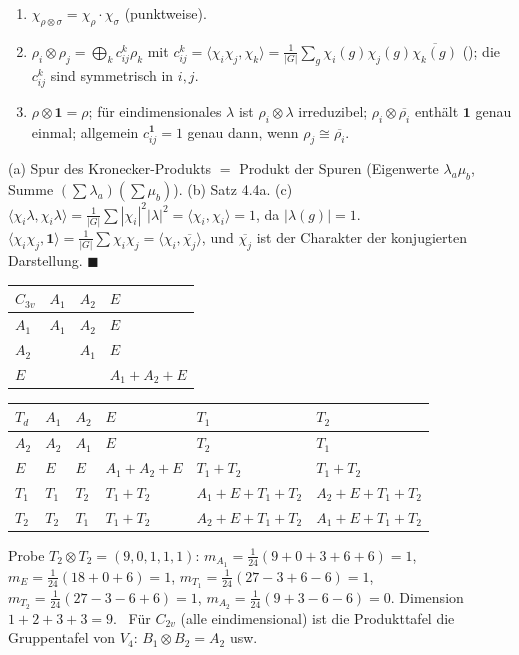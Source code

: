 \begin{merksatz}
\begin{enumerate}[label=(\alph*), leftmargin=1.6em]
\item $\chi_{\rho\otimes\sigma} = \chi_\rho\cdot\chi_\sigma$ (punktweise).
\item $\rho_i\otimes\rho_j = \bigoplus_kc_{ij}^{k}\rho_k$ mit $c_{ij}^{k} = \langle\chi_i\chi_j, \chi_k\rangle = \frac1{|G|}\sum_g\chi_i(g)\chi_j(g)\overline{\chi_k(g)}$ (); die $c_{ij}^{k}$ sind symmetrisch in $i, j$.
\item $\rho\otimes\mathbf 1 = \rho$; für eindimensionales $\lambda$ ist $\rho_i\otimes\lambda$ irreduzibel; $\rho_i\otimes\overline{\rho_i}$ enthält $\mathbf 1$ genau einmal; allgemein $c_{ij}^{\mathbf 1} = 1$ genau dann, wenn $\rho_j\cong\overline{\rho_i}$.
\end{enumerate}

(a) Spur des Kronecker-Produkts $= $ Produkt der Spuren (Eigenwerte $\lambda_a\mu_b$, Summe $(\sum\lambda_a)(\sum\mu_b)$). (b) Satz 4.4a. (c) $\langle\chi_i\lambda, \chi_i\lambda\rangle = \frac1{|G|}\sum|\chi_i|^{2}|\lambda|^{2} = \langle\chi_i, \chi_i\rangle = 1$, da $|\lambda(g)| = 1$. $\langle\chi_i\chi_j, \mathbf 1\rangle = \frac1{|G|}\sum\chi_i\chi_j = \langle\chi_i, \overline{\chi_j}\rangle$, und $\overline{\chi_j}$ ist der Charakter der konjugierten Darstellung. $\blacksquare$

\begin{center}
{\small
\renewcommand{\arraystretch}{1.46}
\begin{tabular}{@{}P{1.0cm}P{0.9cm}P{0.9cm}P{2.6cm}@{}}
\toprule
$C_{3v}$ & $A_1$ & $A_2$ & $E$\\
\midrule
$A_1$ & $A_1$ & $A_2$ & $E$\\
$A_2$ & & $A_1$ & $E$\\
$E$ & & & $A_1 + A_2 + E$\\
\bottomrule
\end{tabular}
\qquad
\begin{tabular}{@{}P{0.8cm}P{0.8cm}P{0.8cm}P{1.8cm}P{2.6cm}P{2.6cm}@{}}
\toprule
$T_d$ & $A_1$ & $A_2$ & $E$ & $T_1$ & $T_2$\\
\midrule
$A_2$ & $A_2$ & $A_1$ & $E$ & $T_2$ & $T_1$\\
$E$ & $E$ & $E$ & $A_1 + A_2 + E$ & $T_1 + T_2$ & $T_1 + T_2$\\
$T_1$ & $T_1$ & $T_2$ & $T_1 + T_2$ & $A_1 + E + T_1 + T_2$ & $A_2 + E + T_1 + T_2$\\
$T_2$ & $T_2$ & $T_1$ & $T_1 + T_2$ & $A_2 + E + T_1 + T_2$ & $A_1 + E + T_1 + T_2$\\
\bottomrule
\end{tabular}}
\end{center}
Probe $T_2\otimes T_2 = (9, 0, 1, 1, 1)$: $m_{A_1} = \frac1{24}(9 + 0 + 3 + 6 + 6) = 1$, $m_E = \frac1{24}(18 + 0 + 6) = 1$, $m_{T_1} = \frac1{24}(27 - 3 + 6 - 6) = 1$, $m_{T_2} = \frac1{24}(27 - 3 - 6 + 6) = 1$, $m_{A_2} = \frac1{24}(9 + 3 - 6 - 6) = 0$. Dimension $1 + 2 + 3 + 3 = 9$. \checkmark\ Für $C_{2v}$ (alle eindimensional) ist die Produkttafel die Gruppentafel von $V_4$: $B_1\otimes B_2 = A_2$ usw.


\end{merksatz}
